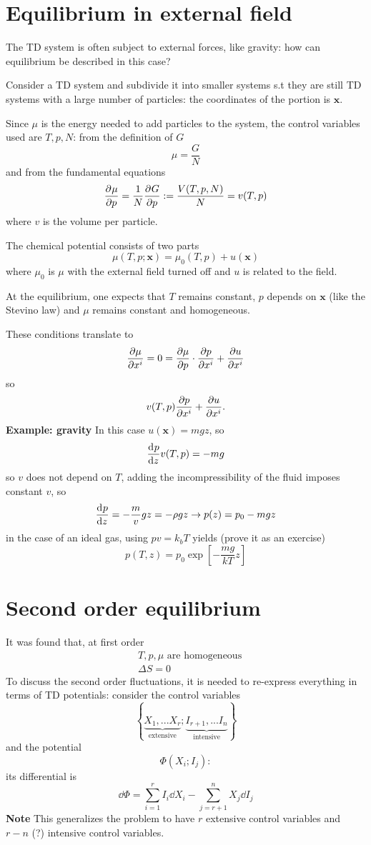 
\section{Equilibrium in external field}
The TD system is often subject to external forces, like gravity: how can equilibrium
be described in this case?

Consider a TD system and subdivide it into smaller systems s.t they are still
TD systems with a large number of particles: the coordinates of the portion is
$\mathbf{x}$.

Since $\mu$ is the energy needed to add particles to the system, the control
variables used are $T,p,N$: from the definition of $G$
$$\mu = \frac{G}{N}$$
and from the fundamental equations
$$\pdv[]{\mu}{p} = \frac{1}{N}\pdv[]{G}{p}:= \frac{V(T,p,N)}{N} = v(T,p)$$
where $v$ is the volume per particle.

The chemical potential consists of two parts
$$\mu(T,p;\mathbf{x}) = \mu_0(T,p)+u(\mathbf{x})$$
where $\mu_0$ is $\mu$ with the external field turned off and $u$ is related to the
field.

At the equilibrium, one expects that $T$ remains constant, $p$ depends on
$\mathbf{x}$ (like the Stevino law) and $\mu$ remains constant and homogeneous.

These conditions translate to
$$\pdv{\mu}{x^i} = 0 = \pdv{\mu}{p}\cdot\pdv{p}{x^i}+\pdv{u}{x^i}$$
so
$$v(T,p)\pdv{p}{x^i}+\pdv{u}{x^i}.$$
\textbf{Example: gravity} In this case $u(\mathbf{x})=mgz$, so
$$\dv[]{p}{z}v(T,p)=-mg$$
so $v$ does not depend on $T$, adding the incompressibility of the fluid imposes
constant $v$, so
$$\dv[]{p}{z} = -\frac{m}{v}gz=-\rho gz \rightarrow p(z) = p_0-mgz$$
in the case of an ideal gas, using $pv=k_bT$ yields (prove it as an exercise)
$$p(T,z)=p_0\exp\left[-\frac{mg}{kT}z\right]$$
\section{Second order equilibrium}
It was found that, at first order
\begin{align*}
&T,p,\mu \text{ are homogeneous}\\
&\Delta S = 0
\end{align*}
To discuss the second order fluctuations, it is needed to re-express everything in
terms of TD potentials: consider the control variables
$$\left\{\underbrace{X_1,...X_r}_\text{extensive};
\underbrace{I_{r+1},...I_n}_\text{intensive}\right\}$$
and the potential
$$\Phi(X_i;I_j):$$
its differential is
$$\dd\Phi = \sum_{i=1}^{r}I_i\dd X_i - \sum_{j=r+1}^{n}X_j\dd I_j$$
\textbf{Note} This generalizes the problem to have $r$ extensive control variables
and $r-n$ (?) intensive control variables.

